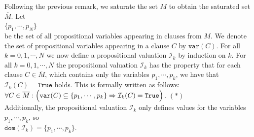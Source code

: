 Following the previous remark, we saturate the set $M$ to obtain the saturated set $\overline{M}$. Let
\\[0.2cm]
\hspace*{1.3cm}
$\{ p_1, \cdots, p_N \}$
\\[0.2cm]
be the set of all propositional variables appearing in clauses from $M$. We denote the set of propositional variables appearing in a clause $C$ by $\mathtt{var}(C)$.
For all $k=0,1,\cdots,N$
we now define a propositional valuation $\mathcal{I}_k$ by induction on $k$.  For all $k=0,1,\cdots,N$ the
propositional valuation $\mathcal{I}_k$ has the property that for each clause $C \in \overline{M}$,
which contains only the variables $p_1,\cdots,p_k$, we have that
$\mathcal{I}_k(C) = \mathtt{True}$ holds. This is formally written as follows:
\\[0.2cm]
\hspace*{1.3cm}
$\forall C \in \overline{M}:\Bigl(\mathtt{var}(C) \subseteq \{p_1, \cdots, p_k\} \Rightarrow \mathcal{I}_k(C) =
\mathtt{True}\Bigl)$. \hspace*{\fill} $(*)$
\\[0.2cm]
Additionally, the propositional valuation $\mathcal{I}_k$ only defines values for the variables
$p_1,\cdots,p_k$, so
\\[0.2cm]
\hspace*{1.3cm}
$\mathtt{dom}(\mathcal{I}_k) = \{p_1, \cdots, p_k\}$.
